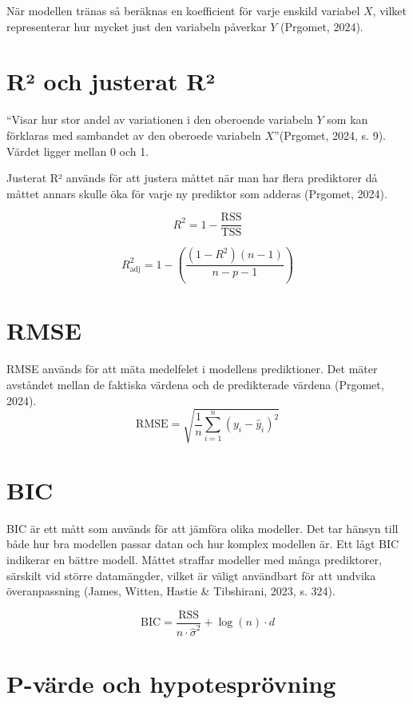 \documentclass[
  letterpaper,
  DIV=11,
  numbers=noendperiod]{scrreprt}
\begin{document}
När modellen tränas så beräknas en koefficient för varje enskild
variabel \(X\), vilket representerar hur mycket just den variabeln
påverkar \(Y\) (Prgomet, 2024).

\section{R² och justerat R²}\label{ruxb2-och-justerat-ruxb2}

``Visar hur stor andel av variationen i den oberoende variabeln \(Y\)
som kan förklaras med sambandet av den oberoede variabeln
\(X\)''(Prgomet, 2024, s. 9). Värdet ligger mellan 0 och 1.

Justerat R² används för att justera måttet när man har flera prediktorer
då måttet annars skulle öka för varje ny prediktor som adderas (Prgomet,
2024).

\[
R^2 = 1 - \frac{\text{RSS}}{\text{TSS}}
\]

\[
R^2_{\text{adj}} = 1 - \left( \frac{(1 - R^2)(n - 1)}{n - p - 1} \right)
\]

\section{RMSE}\label{rmse}

RMSE används för att mäta medelfelet i modellens prediktioner. Det mäter
avståndet mellan de faktiska värdena och de predikterade värdena
(Prgomet, 2024). \[
\text{RMSE} = \sqrt{ \frac{1}{n} \sum_{i=1}^{n} (y_i - \hat{y}_i)^2 }
\]

\section{BIC}\label{bic}

BIC är ett mått som används för att jämföra olika modeller. Det tar
hänsyn till både hur bra modellen passar datan och hur komplex modellen
är. Ett lågt BIC indikerar en bättre modell. Måttet straffar modeller
med många prediktorer, särskilt vid större datamängder, vilket är väligt
användbart för att undvika överanpassning (James, Witten, Hastie \&
Tibshirani, 2023, s. 324).

\[
\text{BIC} = \frac{\text{RSS}}{n \cdot \hat{\sigma}^2} + \log(n) \cdot d
\]

\section{P-värde och
hypotesprövning}\label{p-vuxe4rde-och-hypotespruxf6vning}
\end{document}
